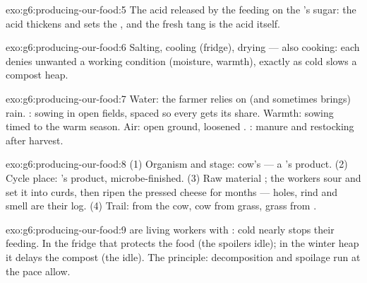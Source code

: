 \begin{solution}{exo:g6:producing-our-food:5}
The acid released by the  feeding on the 's
sugar: the acid thickens and sets the , and the fresh
tang is the acid itself.
\end{solution}

\begin{solution}{exo:g6:producing-our-food:6}
Salting, cooling (fridge), drying --- also cooking: each
denies unwanted  a working condition (moisture,
warmth), exactly as cold slows a compost heap.
\end{solution}

\begin{solution}{exo:g6:producing-our-food:7}
Water: the farmer relies on (and sometimes brings) rain.
: sowing in open fields, spaced so every  gets
its share. Warmth: sowing timed to the warm season. Air:
open ground, loosened . : manure and
restocking after harvest.
\end{solution}

\begin{solution}{exo:g6:producing-our-food:8}
(1) Organism and stage: cow's  --- a 's
product. (2) Cycle place: 's product,
microbe-finished. (3) Raw material ; the workers sour
and set it into curds, then ripen the pressed cheese for
months --- holes, rind and smell are their log. (4) Trail:
 from the cow, cow from grass, grass from .
\end{solution}

\begin{solution}{exo:g6:producing-our-food:9}
 are living workers with : cold nearly
stops their feeding. In the fridge that protects the food
(the spoilers idle); in the winter heap it delays the
compost (the  idle). The principle:
decomposition and spoilage run at the pace 
allow.
\end{solution}

